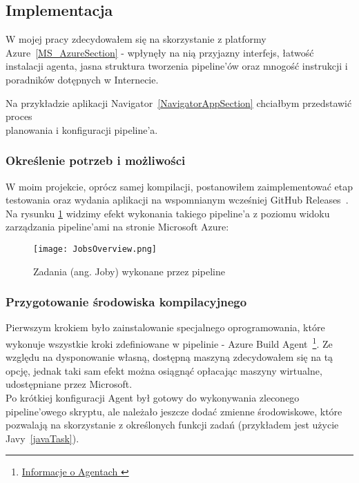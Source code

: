 \subsection{Implementacja}
W mojej pracy zdecydowałem się na skorzystanie z platformy Azure~\ref{MS_AzureSection} - 
wpłynęły na nią przyjazny interfejs, łatwość instalacji agenta, jasna struktura tworzenia pipeline'ów 
oraz mnogość instrukcji i poradników dotępnych w Internecie.

Na przykładzie aplikacji Navigator~\ref{NavigatorAppSection} chciałbym przedstawić proces \\
planowania i konfiguracji pipeline'a.

\subsubsection{Określenie potrzeb i możliwości}
W moim projekcie, oprócz samej kompilacji, postanowiłem zaimplementować etap testowania 
oraz wydania aplikacji na wspomnianym wcześniej GitHub Releases~\cite{githubReleases}.
Na rysunku \ref{img:JobsOverview} widzimy efekt wykonania takiego pipeline'a z poziomu 
widoku zarządzania pipeline'ami na stronie Microsoft Azure:

\begin{figure}[ht]
    \centering
    \texttt{[image: JobsOverview.png]}
    \caption{Zadania (ang. Joby) wykonane przez pipeline}
    \label{img:JobsOverview}
\end{figure}

\newpage

\subsubsection{Przygotowanie środowiska kompilacyjnego}
Pierwszym krokiem było zainstalowanie specjalnego oprogramowania, 
które wykonuje wszystkie kroki zdefiniowane w pipelinie - Azure Build Agent~\footnote[1]{
    \href{https://learn.microsoft.com/en-us/azure/devops/pipelines/agents/agents}{
        Informacje o Agentach
    }
}.
Ze względu na dysponowanie własną, dostępną maszyną zdecydowałem się na tą opcję,
jednak taki sam efekt można osiągnąć opłacając maszyny wirtualne, udostępniane przez Microsoft. \\%
Po krótkiej konfiguracji Agent był gotowy do wykonywania zleconego \\%
pipeline'owego skryptu, ale należało jeszcze dodać zmienne środowiskowe, 
które pozwalają na skorzystanie z określonych funkcji zadań (przykładem jest użycie Javy~\ref{javaTask}).

